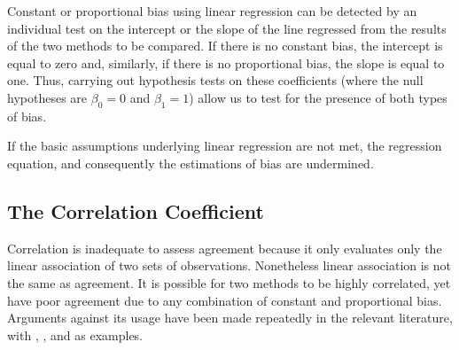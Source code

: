 \documentclass[12pt, a4paper]{report}
\theoremstyle{plain}
\theoremstyle{definition}
\theoremstyle{remark}
\begin{document}
	Constant or proportional bias using linear regression can be detected by an individual test on the intercept or the slope of the line regressed from the results of the two methods to be compared. If there is no constant bias, the intercept is equal to zero and, similarly, if there is no proportional bias, the slope is equal to one. Thus, carrying out hypothesis tests on these coefficients (where the null hypotheses are $\beta_0=0$ and $\beta_1=1$) allow us to test for the presence of both types of bias.
	
	
	If the basic assumptions underlying linear regression are not met, the regression equation, and consequently the estimations of bias are undermined. 
	
	\subsection*{The Correlation Coefficient}
	
	Correlation is inadequate to assess agreement because it only evaluates only the linear association of two sets of observations.  Nonetheless linear association is not the same as agreement. It is possible for two methods to
	be highly correlated, yet have poor agreement due to any combination of constant and proportional bias. Arguments against its usage have been made repeatedly in the relevant literature,  with \citet{BA83}, \citet{BA86}, \citet{BA2003} and \citet{giavarina2015understanding} as examples.
\end{document}
